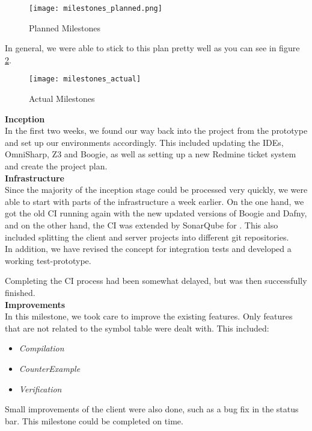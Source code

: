 \begin{figure}[H]
    \centering
    \texttt{[image: milestones\_planned.png]}
    \caption{Planned Milestones}
    \label{fig:planned_milestones}
\end{figure}

In general, we were able to stick to this plan pretty well as you can see in figure \ref{fig:actual_milestones}.

\begin{figure}[H]
    \centering
    \texttt{[image: milestones\_actual]}
    \caption{Actual Milestones}
    \label{fig:actual_milestones}
\end{figure}

{\bf Inception}\\
In the first two weeks, we found our way back into the project from the prototype
and set up our environments accordingly.
This included updating the IDEs, OmniSharp, Z3 and Boogie,
as well as setting up a new Redmine ticket system and create the project plan.\\

{\bf Infrastructure}\\
Since the majority of the inception stage could be processed very quickly,
we were able to start with parts of the infrastructure a week earlier.
On the one hand, we got the old CI running again with the new updated versions of Boogie and Dafny,
and on the other hand, the CI was extended by SonarQube for \Csharp.
This also included splitting the client and server projects into different git repositories.\\

In addition, we have revised the concept for integration tests and developed
a working test-prototype.

Completing the CI process had been somewhat delayed, but was then successfully finished.\\

{\bf Improvements}\\
In this milestone, we took care to improve the existing features.
Only features that are not related to the symbol table were dealt with.
This included:
\begin{itemize}
    \item \textit{Compilation}
    \item \textit{CounterExample}
    \item \textit{Verification}
\end{itemize}

Small improvements of the client were also done, such as a bug fix in the status bar.
This milestone could be completed on time.\\


